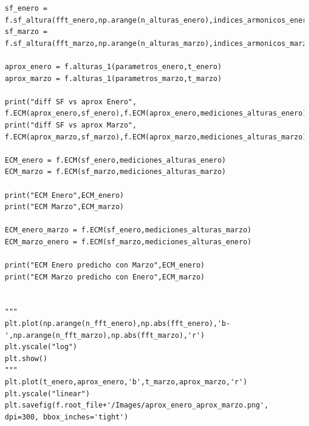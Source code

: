 \documentclass[10pt,a4paper]{article}
\numberwithin{equation}{section}
\numberwithin{figure}{section}
\numberwithin{table}{section}
\begin{document}
\begin{verbatim}
sf_enero = f.sf_altura(fft_enero,np.arange(n_alturas_enero),indices_armonicos_enero)
sf_marzo = f.sf_altura(fft_marzo,np.arange(n_alturas_marzo),indices_armonicos_marzo)

aprox_enero = f.alturas_1(parametros_enero,t_enero)
aprox_marzo = f.alturas_1(parametros_marzo,t_marzo)

print("diff SF vs aprox Enero", f.ECM(aprox_enero,sf_enero),f.ECM(aprox_enero,mediciones_alturas_enero))
print("diff SF vs aprox Marzo", f.ECM(aprox_marzo,sf_marzo),f.ECM(aprox_marzo,mediciones_alturas_marzo))

ECM_enero = f.ECM(sf_enero,mediciones_alturas_enero)
ECM_marzo = f.ECM(sf_marzo,mediciones_alturas_marzo)

print("ECM Enero",ECM_enero)
print("ECM Marzo",ECM_marzo)

ECM_enero_marzo = f.ECM(sf_enero,mediciones_alturas_marzo)
ECM_marzo_enero = f.ECM(sf_marzo,mediciones_alturas_enero)

print("ECM Enero predicho con Marzo",ECM_enero)
print("ECM Marzo predicho con Enero",ECM_marzo)


"""
plt.plot(np.arange(n_fft_enero),np.abs(fft_enero),'b-',np.arange(n_fft_marzo),np.abs(fft_marzo),'r')
plt.yscale("log")
plt.show()
"""
plt.plot(t_enero,aprox_enero,'b',t_marzo,aprox_marzo,'r')
plt.yscale("linear")
plt.savefig(f.root_file+'/Images/aprox_enero_aprox_marzo.png', dpi=300, bbox_inches='tight')






\end{verbatim}
\end{document}
